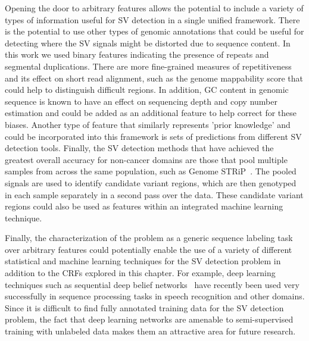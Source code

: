 Opening the door to arbitrary features allows the potential to include a variety of types of information useful for SV detection in a single unified framework. There is the potential to use other types of genomic annotations that could be useful for detecting where the SV signals might be distorted due to sequence content. In this work we used binary features indicating the presence of repeats and segmental duplications. There are more fine-grained measures of repetitiveness and its effect on short read alignment, such as the genome mappability score \cite{Lee:2012bk} that could help to distinguish difficult regions. In addition, GC content in genomic sequence is known to have an effect on sequencing depth and copy number estimation \cite{Benjamini:2012er} and could be added as an additional feature to help correct for these biases. Another type of feature that similarly represents 'prior knowledge' and could be incorporated into this framework is sets of predictions from different SV detection tools. Finally, the SV detection methods that have achieved the greatest overall accuracy for non-cancer domains are those that pool multiple samples from across the same population, such as Genome STRiP~\cite{Handsaker:2011ki}. The pooled signals are used to identify candidate variant regions, which are then genotyped in each sample separately in a second pass over the data. These candidate variant regions could also be used as features within an integrated machine learning technique.

Finally, the characterization of the problem as a generic sequence labeling task over arbitrary features could potentially enable the use of a variety of different statistical and machine learning techniques for the SV detection problem in addition to the CRFs explored in this chapter. For example, deep learning techniques such as sequential deep belief networks~\cite{andrew2012:sdbn} have recently been used very successfully in sequence processing tasks in speech recognition and other domains. Since it is difficult to find fully annotated training data for the SV detection problem, the fact that deep learning networks are amenable to semi-supervised training with unlabeled data \cite{weston2012} makes them an attractive area for future research.
